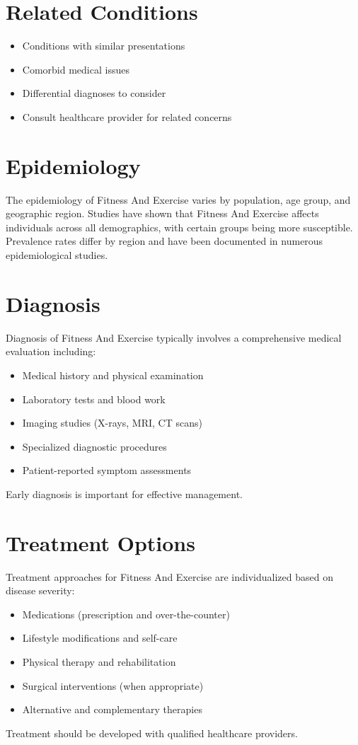 \section*{Related Conditions}
\begin{itemize}
  \item Conditions with similar presentations
  \item Comorbid medical issues
  \item Differential diagnoses to consider
  \item Consult healthcare provider for related concerns
\end{itemize}

\section*{Epidemiology}
The epidemiology of Fitness And Exercise varies by population, age group, and geographic region. Studies have shown that Fitness And Exercise affects individuals across all demographics, with certain groups being more susceptible. Prevalence rates differ by region and have been documented in numerous epidemiological studies.

\section*{Diagnosis}
Diagnosis of Fitness And Exercise typically involves a comprehensive medical evaluation including:
\begin{itemize}
  \item Medical history and physical examination
  \item Laboratory tests and blood work
  \item Imaging studies (X-rays, MRI, CT scans)
  \item Specialized diagnostic procedures
  \item Patient-reported symptom assessments
\end{itemize}
Early diagnosis is important for effective management.

\section*{Treatment Options}
Treatment approaches for Fitness And Exercise are individualized based on disease severity:
\begin{itemize}
  \item Medications (prescription and over-the-counter)
  \item Lifestyle modifications and self-care
  \item Physical therapy and rehabilitation
  \item Surgical interventions (when appropriate)
  \item Alternative and complementary therapies
\end{itemize}
Treatment should be developed with qualified healthcare providers.

